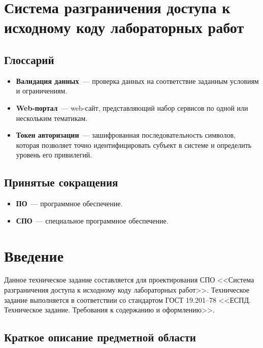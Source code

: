 \documentclass{bmstu}
\begin{document}
  \chapter*{Система разграничения доступа к исходному коду
  лабораторных работ}

  \section*{Глоссарий}

  \begin{itemize}
    \item[] \textbf{Валидация данных}~--- проверка данных на
      соответствие заданным условиям и ограничениям.
    \item[] \textbf{Web-портал}~--- web-сайт, представляющий набор
      сервисов по одной или нескольким тематикам.
    \item[] \textbf{Токен авторизации}~--- зашифрованная
      последовательность символов, которая позволяет точно
      идентифицировать субъект в системе и определить уровень его
      привилегий.
  \end{itemize}

  \section*{Принятые сокращения}

  \begin{itemize}
    \item[] \textbf{ПО}~--- программное обеспечение.
    \item[] \textbf{СПО}~--- специальное программное обеспечение.
  \end{itemize}

  \chapter{Введение}

  Данное техническое задание составляется для проектирования СПО
  <<Система разграничения доступа к исходному коду лабораторных
  работ>>.
  Техническое задание выполняется в соответствии со стандартом ГОСТ
  19.201–78 <<ЕСПД. Техническое задание. Требования к содержанию и
  оформлению>>.

  \section{Краткое описание предметной области}
\end{document}
